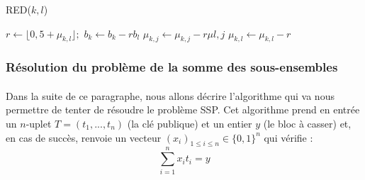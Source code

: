 \begin{algorithm}
\caption{RED($k,l$)}

\begin{algorithmic}[1]
		\State $r \leftarrow \lfloor 0,5 + \mu_{k,l}\rfloor ; $ $ b_k \leftarrow b_k - r b_l$
			\State $\mu_{k,j} \leftarrow \mu_{k,j} - r \mu{l,j}$
		\EndFor
		\State $\mu_{k,l}\leftarrow \mu_{k,l} -r $
	\EndIf
\end{algorithmic}
\end{algorithm}

\subsubsection{Résolution du problème de la somme des sous-ensembles}

\paragraph{}Dans la suite de ce paragraphe, nous allons décrire l'algorithme qui va nous permettre de tenter de résoudre le problème SSP. Cet algorithme prend en entrée un $n$-uplet $T = (t_1, ..., t_n)$ (la clé publique) et un entier $y$ (le bloc à casser) et, en cas de succès, renvoie un vecteur $(x_i)_{1 \leq i \leq n} \in \{0, 1\}^n$ qui vérifie : 
$$\sum_{i = 1}^n x_it_i = y$$

